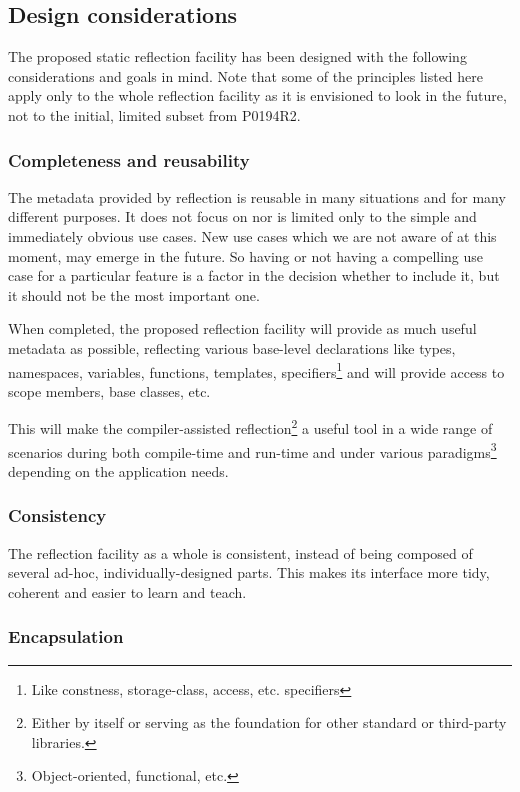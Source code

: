 \subsection{Design considerations}

The proposed static reflection facility has been designed with the following
considerations and goals in mind. 
Note that some of the principles listed here
apply only to the whole reflection facility as it is envisioned
to look in the future, not to the initial, limited subset from P0194R2.

\subsubsection{Completeness and reusability}
\label{design-completeness}

The metadata provided by reflection is reusable in many situations
and for many different purposes.
It does not focus on nor is limited only to the simple and immediately obvious
use cases. New use cases which we are not aware of at this moment, may emerge
in the future. So having or not having a compelling use case for a particular
feature is a factor in the decision whether to include it, but it should
not be the most important one.

When completed, the proposed reflection facility will provide as much useful
metadata as possible, reflecting various base-level
declarations like types, namespaces, variables, functions, templates,
specifiers\footnote{Like constness, storage-class, access, etc. specifiers} and
will provide access to scope members, base classes, etc.

This will make the compiler-assisted reflection\footnote{Either by itself or
serving as the foundation for other standard or third-party libraries.} a useful
tool in a wide range of scenarios during both compile-time
and run-time and under various paradigms\footnote{Object-oriented, functional,
etc.} depending on the application needs.

\subsubsection{Consistency}
\label{design-consistency}

The reflection facility as a whole is consistent, instead of being
composed of several ad-hoc, individually-designed parts. This makes
its interface more tidy, coherent and easier to learn and teach.

\subsubsection{Encapsulation}
\label{design-encapsulation}


